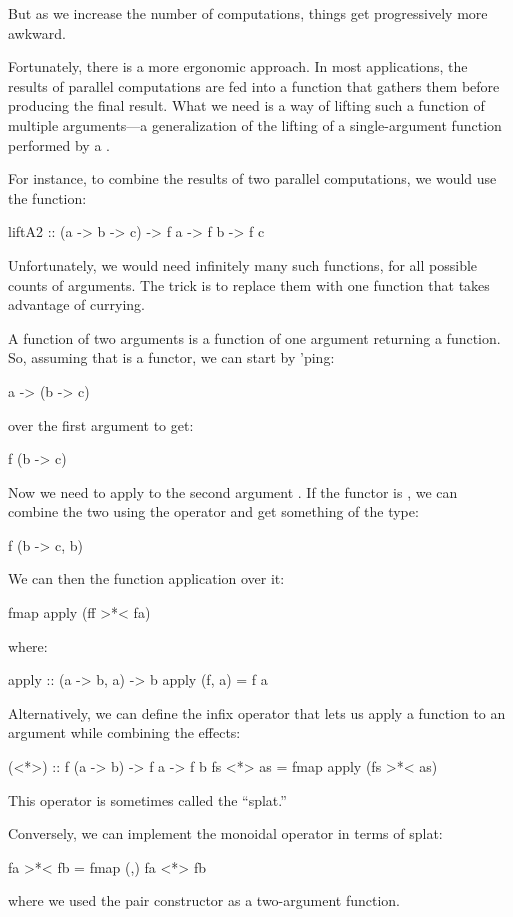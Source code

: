 \documentclass[DaoFP]{subfiles}
\begin{document}
But as we increase the number of computations, things get progressively more awkward. 

Fortunately, there is a more ergonomic approach. In most applications, the results of parallel computations are fed into a function that gathers them before producing the final result. What we need is a way of lifting such a function of multiple arguments---a generalization of the lifting of a single-argument function performed by a . 

For instance, to combine the results of two parallel computations, we would use the function:
\begin{haskell}
liftA2 :: (a -> b -> c) -> f a -> f b -> f c
\end{haskell}
Unfortunately, we would need infinitely many such functions, for all possible counts of arguments. The trick is to replace them with one function that takes advantage of currying.


A function of two arguments is a function of one argument returning a function. So, assuming that  is a functor, we can start by 'ping:
\begin{haskell}
a -> (b -> c)
\end{haskell}
over the first argument  to get:
\begin{haskell}
f (b -> c)
\end{haskell}
Now we need to apply  to the second argument . If the functor is , we can combine the two using the operator \hask{>*< } and get something of the type:
\begin{haskell}
f (b -> c, b)
\end{haskell}
We can then  the function application  over it:
\begin{haskell}
fmap apply (ff >*< fa)
\end{haskell}
where:
\begin{haskell}
apply :: (a -> b, a) -> b
apply (f, a) = f a
\end{haskell}

Alternatively, we can define the infix operator \hask{<*>} that lets us apply a function to an argument while combining the effects:
\begin{haskell}
(<*>) :: f (a -> b) -> f a -> f b
fs <*> as = fmap apply (fs >*< as)
\end{haskell}
This operator is sometimes called the \index{\hask{<*>}}``splat.'' 

Conversely, we can implement the monoidal operator in terms of splat:
\begin{haskell}
fa >*< fb = fmap (,) fa <*> fb
\end{haskell}
where we used the pair constructor \hask{(,)} as a two-argument function.
\end{document}

